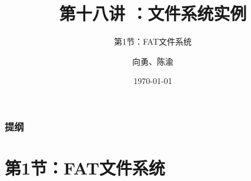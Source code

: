 


\title[第18讲]{第十八讲 ：文件系统实例} %
\subtitle{第1节：FAT文件系统}
\author{向勇、陈渝} %
\date{\today} %



\begin{frame}
\titlepage %
\end{frame}

\begin{frame}
\frametitle{提纲} %
\tableofcontents %

\end{frame}
\section{第1节：FAT文件系统} %
